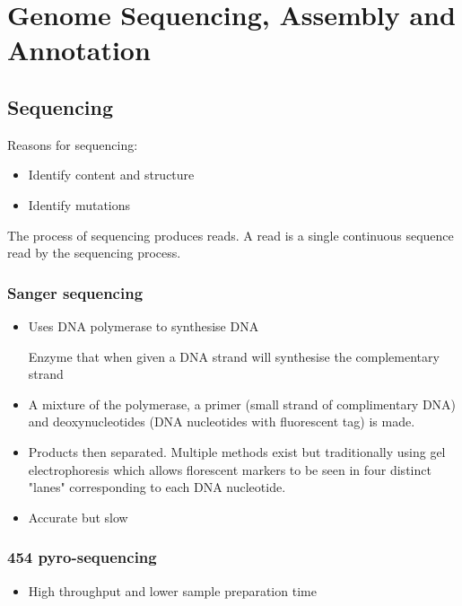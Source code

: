 \documentclass[a4paper]{article}
\begin{document}
\section{Genome Sequencing, Assembly and Annotation}

\subsection{Sequencing}

Reasons for sequencing:

\begin{itemize}
  \item Identify content and structure
  \item Identify mutations
\end{itemize}

The process of sequencing produces reads. A read is a single continuous sequence
read by the sequencing process.

\subsubsection{Sanger sequencing}

\begin{itemize}
  \item
    Uses DNA polymerase to synthesise DNA

    Enzyme that when given a DNA strand will synthesise the complementary strand

  \item
    A mixture of the polymerase, a primer (small strand of complimentary DNA)
    and deoxynucleotides (DNA nucleotides with fluorescent tag) is made.

  \item
    Products then separated. Multiple methods exist but traditionally using gel
    electrophoresis which allows florescent markers to be seen in four distinct
    "lanes" corresponding to each DNA nucleotide.

  \item
    Accurate but slow

\end{itemize}

\subsubsection{454 pyro-sequencing}

\begin{itemize}
  \item High throughput and lower sample preparation time
\end{itemize}
\end{document}
